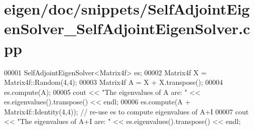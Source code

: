 \hypertarget{eigen_2doc_2snippets_2_self_adjoint_eigen_solver___self_adjoint_eigen_solver_8cpp_source}{}\section{eigen/doc/snippets/\+Self\+Adjoint\+Eigen\+Solver\+\_\+\+Self\+Adjoint\+Eigen\+Solver.cpp}
\label{eigen_2doc_2snippets_2_self_adjoint_eigen_solver___self_adjoint_eigen_solver_8cpp_source}

\begin{DoxyCode}
00001 SelfAdjointEigenSolver<Matrix4f> es;
00002 Matrix4f X = Matrix4f::Random(4,4);
00003 Matrix4f A = X + X.transpose();
00004 es.compute(A);
00005 cout << \textcolor{stringliteral}{"The eigenvalues of A are: "} << es.eigenvalues().transpose() << endl;
00006 es.compute(A + Matrix4f::Identity(4,4)); \textcolor{comment}{// re-use es to compute eigenvalues of A+I}
00007 cout << \textcolor{stringliteral}{"The eigenvalues of A+I are: "} << es.eigenvalues().transpose() << endl;
\end{DoxyCode}
